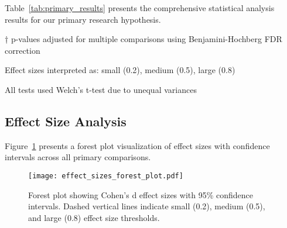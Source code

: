 \documentclass[conference]{IEEEtran}
\begin{document}
Table~\ref{tab:primary_results} presents the comprehensive statistical analysis results for our primary research hypothesis.

\begin{table}[htbp]
\centering
\caption{Primary Statistical Analysis Results}
\label{tab:primary_results}
\begin{tablenotes}
\footnotesize
\item[†] p-values adjusted for multiple comparisons using Benjamini-Hochberg FDR correction
\item Effect sizes interpreted as: small (0.2), medium (0.5), large (0.8)
\item All tests used Welch's t-test due to unequal variances
\end{tablenotes}
\end{table}

\subsection{Effect Size Analysis}
\label{subsec:effect_sizes}

Figure~\ref{fig:forest_plot} presents a forest plot visualization of effect sizes with confidence intervals across all primary comparisons.

\begin{figure}[htbp]
\centering
\texttt{[image: effect\_sizes\_forest\_plot.pdf]}
\caption{Forest plot showing Cohen's d effect sizes with 95\% confidence intervals. Dashed vertical lines indicate small (0.2), medium (0.5), and large (0.8) effect size thresholds.}
\label{fig:forest_plot}
\end{figure}
\end{document}
